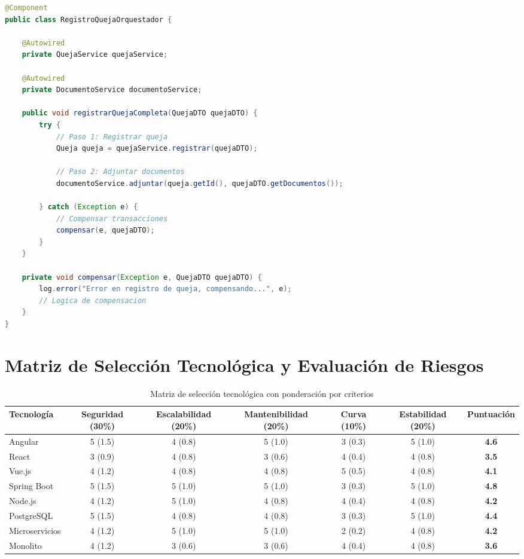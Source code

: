 \begin{lstlisting}[language=Java, caption=Patrón SAGA orquestado]
@Component
public class RegistroQuejaOrquestador {
    
    @Autowired
    private QuejaService quejaService;
    
    @Autowired
    private DocumentoService documentoService;
    
    public void registrarQuejaCompleta(QuejaDTO quejaDTO) {
        try {
            // Paso 1: Registrar queja
            Queja queja = quejaService.registrar(quejaDTO);
            
            // Paso 2: Adjuntar documentos
            documentoService.adjuntar(queja.getId(), quejaDTO.getDocumentos());
            
        } catch (Exception e) {
            // Compensar transacciones
            compensar(e, quejaDTO);
        }
    }
    
    private void compensar(Exception e, QuejaDTO quejaDTO) {
        log.error("Error en registro de queja, compensando...", e);
        // Logica de compensacion
    }
}
\end{lstlisting}

\section{Matriz de Selección Tecnológica y Evaluación de Riesgos}

\begin{table}[htbp]
\centering
\caption{Matriz de selección tecnológica con ponderación por criterios}
\label{tab:matriz-seleccion}
\small
\begin{tabular}{|p{2.2cm}|c|c|c|c|c|c|}
\hline
\textbf{Tecnología} & \textbf{Seguridad (30\%)} & \textbf{Escalabilidad (20\%)} & \textbf{Mantenibilidad (20\%)} & \textbf{Curva (10\%)} & \textbf{Estabilidad (20\%)} & \textbf{Puntuación} \\
\hline
Angular & 5 (1.5) & 4 (0.8) & 5 (1.0) & 3 (0.3) & 5 (1.0) & \textbf{4.6} \\
\hline
React & 3 (0.9) & 4 (0.8) & 3 (0.6) & 4 (0.4) & 4 (0.8) & \textbf{3.5} \\
\hline
Vue.js & 4 (1.2) & 4 (0.8) & 4 (0.8) & 5 (0.5) & 4 (0.8) & \textbf{4.1} \\
\hline
Spring Boot & 5 (1.5) & 5 (1.0) & 5 (1.0) & 3 (0.3) & 5 (1.0) & \textbf{4.8} \\
\hline
Node.js & 4 (1.2) & 5 (1.0) & 4 (0.8) & 4 (0.4) & 4 (0.8) & \textbf{4.2} \\
\hline
PostgreSQL & 5 (1.5) & 4 (0.8) & 4 (0.8) & 3 (0.3) & 5 (1.0) & \textbf{4.4} \\
\hline
Microservicios & 4 (1.2) & 5 (1.0) & 5 (1.0) & 2 (0.2) & 4 (0.8) & \textbf{4.2} \\
\hline
Monolito & 4 (1.2) & 3 (0.6) & 3 (0.6) & 4 (0.4) & 4 (0.8) & \textbf{3.6} \\
\hline
\end{tabular}
\end{table}

